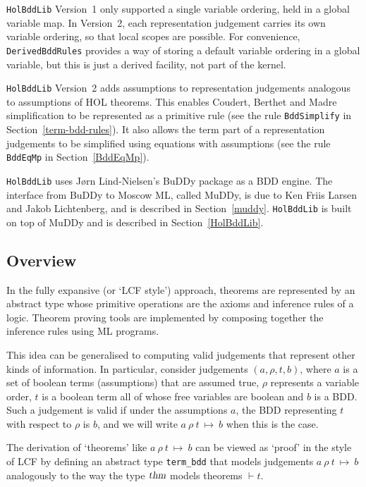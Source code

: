 \documentclass[12pt,fleqn]{article}
\renewcommand{\t}[1]{\mbox{\tt #1}}
\newcommand{\termbdd}[4]{\mbox{$#1~#2~#3~\mapsto~#4$}}
\newcommand\termbddty{\texttt{term\_bdd}{}}
\newcommand{\Buddy}{BuDDy{}}
\newcommand{\Muddy}{MuDDy{}}
\begin{document}
{\tt{HolBddLib}} Version~1 only supported a single variable
ordering, held in a global variable map. In Version~2, each
representation judgement carries its own variable ordering, so that local
scopes are possible. For convenience, {\tt{DerivedBddRules}}
provides a way of storing a default variable ordering in a global
variable, but this is just a derived facility, not part of the kernel.

{\tt{HolBddLib}} Version~2 adds assumptions to representation judgements
analogous to assumptions of HOL theorems. This enables
Coudert, Berthet and Madre simplification to be represented as a primitive
rule (see the rule \t{BddSimplify} in Section~\ref{term-bdd-rules}). It also allows the term part
of a representation judgements to be simplified using equations with assumptions
(see the rule \t{BddEqMp} in Section~\ref{BddEqMp}).

{\tt HolBddLib} uses J{\o}rn Lind-Nielsen's \Buddy{} package as a BDD
engine. The interface from \Buddy{} to Moscow ML, called \Muddy, is
due to Ken Friis Larsen and Jakob Lichtenberg, and is described in Section~\ref{muddy}.
{\tt HolBddLib} is built on top of \Muddy{} and
is described in Section~\ref{HolBddLib}.

\subsection{Overview}

In the fully expansive (or `LCF style') approach, theorems are represented by an abstract type
whose primitive operations are the axioms and inference rules of a
logic.  Theorem proving tools are implemented by composing together
the inference rules using ML programs.

This idea can be generalised to computing valid judgements that
represent other kinds of information. In particular, consider
judgements $(a,\rho,t,b)$, where $a$ is a set of boolean terms
(assumptions) that are assumed true, $\rho$ represents a variable
order, $t$ is a boolean term all of whose free variables are boolean
and $b$ is a BDD. Such a judgement is valid if under the assumptions
$a$, the BDD representing $t$ with respect to $\rho$ is $b$, and we
will write \termbdd{a}{\rho}{t}{b} when this is the case.

The derivation of `theorems' like \termbdd{a}{\rho}{t}{b} can be viewed
as `proof' in the style of LCF by defining an abstract type \termbddty{}
that models
judgements $\termbdd{a}{\rho}{t}{b}$ analogously
to the way the type $\textsl{thm}$ models theorems $\vdash t$.
\end{document}
